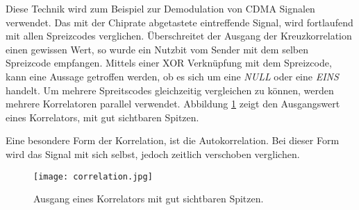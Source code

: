 Diese Technik wird zum Beispiel zur Demodulation von CDMA Signalen verwendet. Das mit der Chiprate abgetastete eintreffende Signal, wird fortlaufend mit allen Spreizcodes verglichen. Überschreitet der Ausgang der Kreuzkorrelation einen gewissen Wert, so wurde ein Nutzbit vom Sender mit dem selben Spreizcode empfangen. Mittels einer XOR Verknüpfung mit dem Spreizcode, kann eine Aussage getroffen werden, ob es sich um eine \emph{NULL} oder eine \emph{EINS} handelt. Um mehrere Spreitscodes gleichzeitig vergleichen zu können, werden mehrere Korrelatoren parallel verwendet. Abbildung \ref{fig:Korrelator} zeigt den Ausgangswert eines Korrelators, mit gut sichtbaren Spitzen.

Eine besondere Form der Korrelation, ist die Autokorrelation. Bei dieser Form wird das Signal mit sich selbst, jedoch zeitlich verschoben verglichen. 

\begin{figure}[H]
\centering
\texttt{[image: correlation.jpg]}
\caption{Ausgang eines Korrelators mit gut sichtbaren Spitzen.}
\label{fig:Korrelator}
\end{figure}